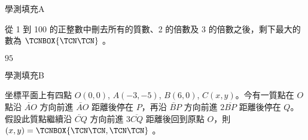 \begin{QUESTIONS}
    \begin{QUESTION}
        \begin{ExamInfo}{98}{學測}{填充}{A}
        \end{ExamInfo}
        \begin{ExamAnsRateInfo}{76}{92}{86}{50}
        \end{ExamAnsRateInfo}
        \begin{QBODY}
            從 1 到 100 的正整數中刪去所有的質數、2 的倍數及 3 的倍數之後，剩下最大的數為 $\TCNBOX{\TCN\TCN}$ 。
        \end{QBODY}
        \begin{QFROMS}
        \end{QFROMS}
        \begin{QTAGS}\end{QTAGS}
        \begin{QANS}
            $95$
        \end{QANS}
        \begin{QSOLLIST}
        \end{QSOLLIST}
        \begin{QEMPTYSPACE}
        \end{QEMPTYSPACE}
    \end{QUESTION}
    \begin{QUESTION}
        \begin{ExamInfo}{98}{學測}{填充}{B}
        \end{ExamInfo}
        \begin{ExamAnsRateInfo}{31}{69}{22}{2}
        \end{ExamAnsRateInfo}
        \begin{QBODY}
            坐標平面上有四點 $O(0,0)$, $A(-3,-5)$, $B(6,0)$, $C(x,y)$。今有一質點在 $O$ 點沿 $\lvec{AO}$ 方向前進 $\lvec{AO}$ 距離後停在 $P$，再沿 $\lvec{BP}$ 方向前進 $2\overline{BP}$ 距離後停在 $Q$。 假設此質點繼續沿 $\lvec{CQ}$ 方向前進 $3\overline{CQ}$ 距離後回到原點 $O$，則 $(x,y)=\TCNBOX{\TCN\TCN,\TCN\TCN}$ 。
        \end{QBODY}
        \begin{QFROMS}
        \end{QFROMS}
        \begin{QTAGS}\end{QTAGS}
        \begin{QANS}

\end{QANS}
\end{QUESTION}
\end{QUESTIONS}
